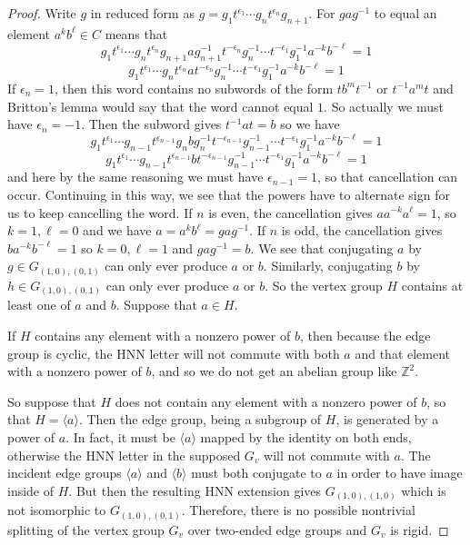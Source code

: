 \documentclass[10pt]{article}
\def\integers{{\mathbb{Z}}}
\def\sups{\supseteq}
\theoremstyle{definition}
\begin{document}
\begin{proof}
Write $g$ in reduced form as $g = g_1 t^{\epsilon_1} \cdots g_n t^{\epsilon_n} g_{n+1}$. For $g a g^{-1}$ to equal an element $a^k b^\ell \in C$ means that 
$$g_1 t^{\epsilon_1} \cdots g_n t^{\epsilon_n} g_{n+1} a g_{n+1}^{-1} t^{-\epsilon_n} g_n^{-1} \cdots t^{-\epsilon_1} g_1^{-1} a^{-k} b^{-\ell} = 1 $$
$$g_1 t^{\epsilon_1} \cdots g_n t^{\epsilon_n} a  t^{-\epsilon_n} g_n^{-1} \cdots t^{-\epsilon_1} g_1^{-1} a^{-k} b^{-\ell} = 1 $$
If $\epsilon_n=1$, then this word contains no subwords of the form $tb^m t^{-1}$ or $t^{-1} a^m t$ and Britton's lemma would say that the word cannot equal $1$. So actually we must have $\epsilon_n = -1$. Then the subword gives $t^{-1} a t = b$ so we have
$$g_1 t^{\epsilon_1} \cdots g_{n-1} t^{\epsilon_{n-1}} g_n b g_n^{-1}  t^{-\epsilon_{n-1}} g_{n-1}^{-1}\cdots t^{-\epsilon_1} g_1^{-1} a^{-k} b^{-\ell} = 1 $$
$$g_1 t^{\epsilon_1} \cdots g_{n-1} t^{\epsilon_{n-1}} b  t^{-\epsilon_{n-1}} g_{n-1}^{-1}\cdots t^{-\epsilon_1} g_1^{-1} a^{-k} b^{-\ell} = 1 $$
and here by the same reasoning we must have $\epsilon_{n-1}=1$, so that cancellation can occur. Continuing in this way, we see that the powers have to alternate sign for us to keep cancelling the word. If $n$ is even, the cancellation gives $a a^{-k} a^\ell = 1$, so $k=1, \ell=0$ and we have $a=a^k b^\ell = gag^{-1}$. If $n$ is odd, the cancellation gives $b a^{-k} b^{-\ell} = 1$ so $k=0, \ell=1$ and $gag^{-1}=b$. We see that conjugating $a$ by $g\in G_{(1,0), (0,1)}$ can only ever produce $a$ or $b$. Similarly, conjugating $b$ by $h\in G_{(1,0),(0,1)}$ can only ever produce $a$ or $b$. So the vertex group $H$ contains at least one of $a$ and $b$. Suppose that $a\in H$. 


If $H$ contains any element with a nonzero power of $b$, then because the edge group is cyclic, the HNN letter will not commute with both $a$ and that element with a nonzero power of $b$, and so we do not get an abelian group like $\integers^2$. 
\begin{center}
\end{center}

So suppose that $H$ does not contain any element with a nonzero power of $b$, so that $H = \langle a \rangle$. Then the edge group, being a subgroup of $H$, is generated by a power of $a$. In fact, it must be $\langle a \rangle$ mapped by the identity on both ends, otherwise the HNN letter in the supposed $G_v$ will not commute with $a$. The incident edge groups $\langle a \rangle$ and $\langle b \rangle$ must both conjugate to $a$ in order to have image inside of $H$. But then the resulting HNN extension gives $G_{(1,0), (1,0)}$ which is not isomorphic to $G_{(1,0),(0,1)}$. Therefore, there is no possible nontrivial splitting of the vertex group $G_v$ over two-ended edge groups and  $G_v$ is rigid. 
\end{proof}
\end{document}
